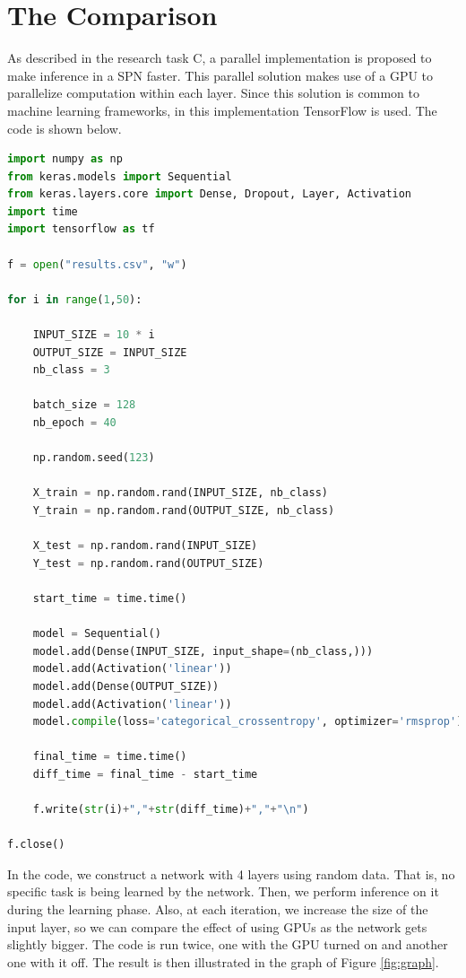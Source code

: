 \section{The Comparison}
\label{sec:new}

As described in the research task C, a parallel implementation is proposed to make inference in a SPN faster.
This parallel solution makes use of a GPU to parallelize computation within each layer.
Since this solution is common to machine learning frameworks, in this implementation TensorFlow is used.
The code is shown below.

\begin{lstlisting}[language=Python]
import numpy as np
from keras.models import Sequential
from keras.layers.core import Dense, Dropout, Layer, Activation
import time
import tensorflow as tf

f = open("results.csv", "w")

for i in range(1,50):

    INPUT_SIZE = 10 * i
    OUTPUT_SIZE = INPUT_SIZE
    nb_class = 3

    batch_size = 128
    nb_epoch = 40

    np.random.seed(123)

    X_train = np.random.rand(INPUT_SIZE, nb_class)
    Y_train = np.random.rand(OUTPUT_SIZE, nb_class)

    X_test = np.random.rand(INPUT_SIZE)
    Y_test = np.random.rand(OUTPUT_SIZE)

    start_time = time.time()

    model = Sequential()
    model.add(Dense(INPUT_SIZE, input_shape=(nb_class,)))
    model.add(Activation('linear'))
    model.add(Dense(OUTPUT_SIZE))
    model.add(Activation('linear'))
    model.compile(loss='categorical_crossentropy', optimizer='rmsprop')

    final_time = time.time()
    diff_time = final_time - start_time

    f.write(str(i)+","+str(diff_time)+","+"\n")

f.close()   
\end{lstlisting}


In the code, we construct a network with 4 layers using random data.
That is, no specific task is being learned by the network.
Then, we perform inference on it during the learning phase.
Also, at each iteration, we increase the size of the input layer, so we can compare the effect of using GPUs as the network gets slightly bigger.
The code is run twice, one with the GPU turned on and another one with it off.
The result is then illustrated in the graph of Figure \ref{fig:graph}.

